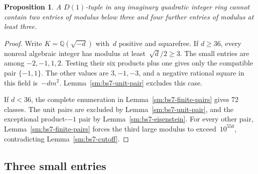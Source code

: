 \documentclass[12pt]{article}
\newtheorem{proposition}[theorem]{Proposition}
\numberwithin{equation}{section}
\begin{document}
\begin{proposition}\label{sm:five-two-small-four-large}
A $D(1)$-tuple in any imaginary quadratic integer ring cannot contain two entries of modulus below three and four further entries of modulus at least three.
\end{proposition}
\begin{proof}
Write $K=\mathbb Q(\sqrt{-d})$ with~$d$ positive and squarefree. If $d\ge36$, every nonreal algebraic integer has modulus at least~$\sqrt d/2\ge3$. The small entries are among $-2,-1,1,2$. Testing their six products plus one gives only the compatible pair $\{-1,1\}$. The other values are $3,-1,-3$, and a negative rational square in this field is~$-dm^2$. Lemma~\ref{sm:bs7-unit-pair} excludes this case.

If $d<36$, the complete enumeration in Lemma~\ref{sm:bs7-finite-pairs} gives 72 classes. The unit pairs are excluded by Lemma~\ref{sm:bs7-unit-pair}, and the exceptional product-$-1$ pair by Lemma~\ref{sm:bs7-eisenstein}. For every other pair, Lemma~\ref{sm:bs7-finite-pairs} forces the third large modulus to exceed~$10^{550}$, contradicting Lemma~\ref{sm:bs7-cutoff}.
\end{proof}




\subsection{Three small entries}
\end{document}
